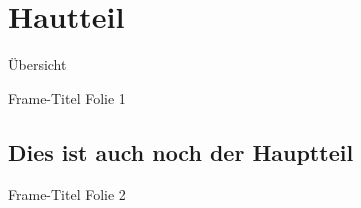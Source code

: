 \section{Hautteil}
\begin{frame}{Übersicht}{}
	\tableofcontents[currentsection]
\end{frame}

\begin{frame}{Frame-Titel}{}
Folie 1
\end{frame}

\subsection[Weiterhin Hauptteil]{Dies ist auch noch der Hauptteil}
\begin{frame}{Frame-Titel}{}
Folie 2
\end{frame}
